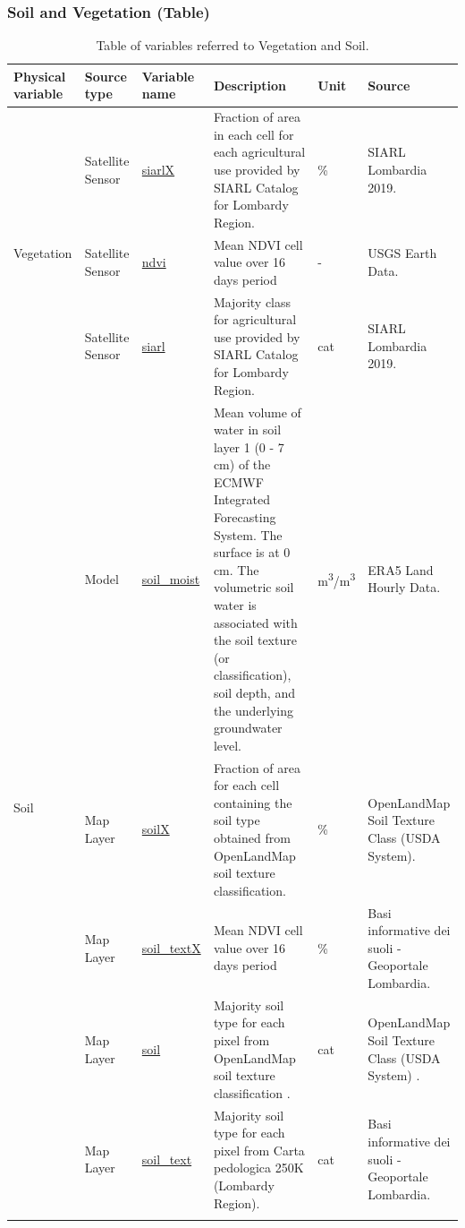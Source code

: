 \subsubsection{Soil and Vegetation (Table)}

\begin{center}
\setlength{\arrayrulewidth}{1.5pt}
\begin{longtable}{ |p{2cm}|p{1.5cm}|p{2.3cm}|p{4cm}|p{1cm}|p{2cm}| } 
\hline
\textbf{Physical variable} & \textbf{Source type}  & \textbf{Variable name}  & \textbf{Description}  & \textbf{Unit}  & \textbf{Source}\\ 
\hline

\multirow{3}{4em}{Vegetation} & Satellite \newline Sensor  & \underline{siarlX} & Fraction of area in each cell for each agricultural use provided by SIARL Catalog for Lombardy Region. & \% & SIARL Lombardia 2019.\\ 
& Satellite \newline Sensor  & \underline{ndvi} &  Mean NDVI cell value over 16 days period & - & USGS Earth Data.\\ 
& Satellite \newline Sensor  & \underline{siarl} &  Majority class for agricultural use provided by SIARL Catalog for Lombardy Region. & cat & SIARL Lombardia 2019.\\
\hline

\multirow{5}{4em}{Soil} & Model  & \underline{soil\_moist} & Mean volume of water in soil layer 1 (0 - 7 cm) of the ECMWF Integrated Forecasting System. The surface is at 0 cm. The volumetric soil water is associated with the soil texture (or classification), soil depth, and the underlying groundwater level. & m\textsuperscript{3}/m\textsuperscript{3} & ERA5 Land Hourly Data.\\ 
& Map Layer  & \underline{soilX} &  Fraction of area for each cell containing the soil type obtained from OpenLandMap soil texture classification. & \% & OpenLandMap Soil Texture Class (USDA System).\\ 
& Map Layer  & \underline{soil\_textX} &  Mean NDVI cell value over 16 days period & \% & Basi informative dei suoli - Geoportale Lombardia.\\ 
& Map Layer  & \underline{soil} &  Majority soil type for each pixel from OpenLandMap soil texture classification . & cat & OpenLandMap Soil Texture Class (USDA System) .\\ 
& Map Layer  & \underline{soil\_text} &  Majority soil type for each pixel from Carta pedologica 250K (Lombardy Region). & cat & Basi informative dei suoli - Geoportale Lombardia.\\ 

\hline
\caption{Table of variables referred to Vegetation and Soil.}

\end{longtable}
\end{center}

